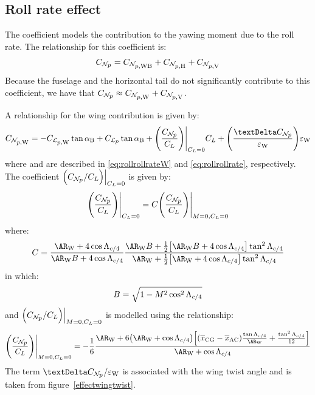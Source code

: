 \subsection{Roll rate effect}
\label{subsec2.6.1}

The coefficient \CNprate models the contribution to the yawing moment due to the roll rate. The relationship for this coefficient is:
\begin{equation}
\label{eq:yawrollrate}
\CNprate = \CNprateWB + \CNprateH + \CNprateV
\end{equation}
Because the fuselage and the horizontal tail do not significantly contribute to this coefficient, we have that $\CNprate \approx \CNprateW + \CNprateV$.

A relationship for the wing contribution is given by:
\begin{equation}
\label{eq:yawrollrateW}
\CNprateW = -\CLprateW \tan \alphaB + \CLprate \tan \alphaB + \Biggl( \frac{\CNprate}{\CLift} \Biggr) \Bigg|_{\CLift = 0} \CLift + \Biggl( \frac{\textrm \textDelta\CNprate}{\epsW} \Biggr) \epsW
\end{equation}
where \CLprateW and \CLprate are described in \ref{eq:rollrollrateW} and \ref{eq:rollrollrate}, respectively. The coefficient $\Bigl( {\CNprate}/{\CLift} \Bigr) \Big|_{\CLift = 0}$ is given by: 
\begin{equation}
\Biggl( \frac{\CNprate}{\CLift} \Biggr) \Bigg|_{\CLift = 0} = C \Biggl( \frac{\CNprate}{\CLift} \Biggr) \Bigg|_{M = 0, \CLift = 0}
\end{equation}
where:
\begin{equation}
C = \frac{\ARW + 4\cos\LambdaQC}{\ARW B + 4\cos\LambdaQC} \frac{\ARW B + \frac{1}{2} \bigl [\ARW B + 4\cos\LambdaQC \bigr ] \tan^2\LambdaQC}{\ARW + \frac{1}{2} \bigl [\ARW + 4\cos\LambdaQC \bigr ] \tan^2\LambdaQC}
\end{equation}
in which:
\begin{equation}
B = \sqrt{1 - M^2 \cos^2\Lambda_{c/4}}
\end{equation}
and $\Bigl ( \CNprate / \CLift \Bigr ) \Big|_{M = 0, \CLift = 0}$ is modelled using the relationship:
\begin{equation}
\Biggl( \frac{\CNprate}{\CLift} \Biggr) \Bigg|_{M = 0, \CLift = 0} = - \frac{1}{6} \frac{\ARW + 6 \bigl (\ARW + \cos\LambdaQC \bigr ) \Bigl[ (\xcgadim - \xacadim)\frac{\tan\LambdaQC}{\ARW} + \frac{\tan^2\LambdaQC}{12} \Bigr]}{\ARW + \cos\LambdaQC}
\end{equation}
The term ${\textrm \textDelta\CNprate}/{\epsW}$ is associated with the wing twist angle and is taken from figure~\vref{effectwingtwist}.

